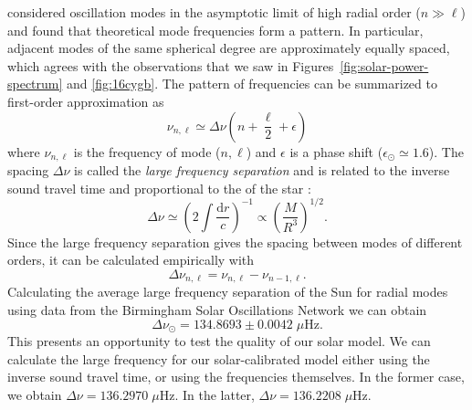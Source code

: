 \citet{1980ApJS...43..469T} considered oscillation modes in the asymptotic limit of high radial order (${n\gg\ell}$) and found that theoretical mode frequencies form a pattern. 
In particular, adjacent modes of the same spherical degree are approximately equally spaced, which agrees with the observations that we saw in Figures~\ref{fig:solar-power-spectrum} and \ref{fig:16cygb}. 
The pattern of frequencies can be summarized to first-order approximation as 
\begin{equation} \label{eq:asymptotic}
    \nu_{n,\ell} \simeq \Delta\nu \left( n + \frac{\ell}{2} + \epsilon \right)
\end{equation}
where $\nu_{n,\ell}$ is the frequency of mode (${n,\ell}$) and $\epsilon$ is a phase shift (${\epsilon_\odot\simeq 1.6}$). 
The spacing ${\Delta\nu}$ is called the \emph{large frequency separation} and is related to the inverse sound travel time and proportional to the  of the star \citep{1986apj...306l..37u, 1995A&A...293...87K}:
\begin{equation}
    \Delta\nu
    \simeq
    \left( 
        2 \int \frac{\text{d}r}{c}
    \right)^{-1}
    \propto
    \left(
        \frac{M}{R^3}
    \right)^{1/2}. 
\end{equation}
Since the large frequency separation gives the spacing between modes of different orders, it can be calculated empirically with
\begin{equation} \label{eq:Dnu}
    \Delta\nu_{n,\ell} 
    =
    \nu_{n,\ell}
    -
    \nu_{n-1,\ell}.
\end{equation}
Calculating the average large frequency separation of the Sun for radial modes using data from the Birmingham Solar Oscillations Network \citep[\emph{BiSON},][]{2009mnras.396l.100b} we can obtain 
\begin{equation}
    \Delta\nu_\odot = 134.8693 \pm 0.0042\;\mu\text{Hz}. 
\end{equation}
This presents an opportunity to test the quality of our solar model. 
We can calculate the large frequency for our solar-calibrated model either using the inverse sound travel time, or using the frequencies themselves. 
In the former case, we obtain ${\Delta\nu = 136.2970\;\mu\text{Hz}}$. 
In the latter, ${\Delta\nu = 136.2208\;\mu\text{Hz}}$. 

